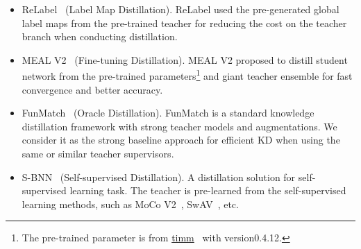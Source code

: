 \documentclass[10pt,twocolumn,letterpaper]{article}
\begin{document}
\begin{table*}[t]
\vspace{-0.08in}

\centering
\caption{Ablation results (Top-1) on ImageNet-1K of different numbers () of cropping regions within an image used in a {\em mini}-batch.}
\label{tab:my-table_ablation_crops}
\vspace{-0.15in}
\end{table*}

\vspace{-0.08in} 
\begin{itemize}[leftmargin=0.2in]
	\addtolength{\itemsep}{-0.08in}
	\item[] ReLabel~\cite{yun2021re} (Label Map Distillation). ReLabel used the pre-generated global label maps from the pre-trained teacher for reducing the cost on the teacher branch when conducting distillation.
	\item[] MEAL V2~\cite{shen2020meal} (Fine-tuning Distillation). MEAL V2 proposed to distill student network from the pre-trained parameters\footnote{The pre-trained parameter is from \href{https://github.com/rwightman/pytorch-image-models}{timm}~\cite{rw2019timm} with version0.4.12.} and giant teacher ensemble for fast convergence and better accuracy.
	\item[] FunMatch~\cite{yun2021re} (Oracle Distillation). FunMatch is a standard knowledge distillation framework with strong teacher models and augmentations. We consider it as the strong baseline approach for efficient KD when using the same or similar teacher supervisors.
	\item[] S-BNN~\cite{yun2021re} (Self-supervised Distillation). A distillation solution for self-supervised learning task. The teacher is pre-learned from the self-supervised learning methods, such as MoCo V2~\cite{chen2020improved}, SwAV~\cite{caron2020unsupervised}, etc.
\end{itemize}
\end{document}
